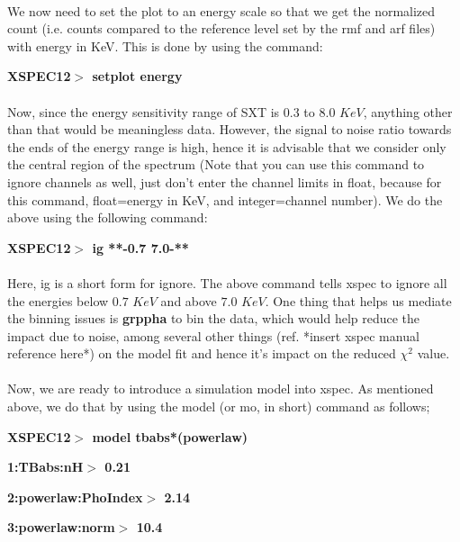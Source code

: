 \documentclass[a4paper,twoside]{report}
\numberwithin{equation}{section}
\begin{document}
\paragraph{}
We now need to set the plot to an energy scale so that we get the normalized count (i.e. counts compared to the reference level set by the rmf and arf files) with energy in KeV. This is done by using the command:
\begin{center}
\item \large \textbf{XSPEC12$>$ setplot energy}
\end{center}
\paragraph{}
Now, since the energy sensitivity range of SXT is $0.3$ to $8.0$ $KeV$, anything other than that would be meaningless data. However, the signal to noise ratio towards the ends of the energy range is high, hence it is advisable that we consider only the central region of the spectrum (Note that you can use this command to ignore channels as well, just don't enter the channel limits in float, because for this command, float=energy in KeV, and integer=channel number). We do the above using the following command:
\begin{center}
\item \large \textbf{XSPEC12$>$ ig **-0.7 7.0-**}
\end{center}
\paragraph{}
Here, ig is a short form for ignore. The above command tells xspec to ignore all the energies below $0.7$ $KeV$ and above $7.0$ $KeV$. One thing that helps us mediate the binning issues is \textbf{grppha} to bin the data, which would help reduce the impact due to noise, among several other things (ref. *insert xspec manual reference here*) on the model fit and hence it's impact on the reduced $\chi^2$ value.
\paragraph{}
Now, we are ready to introduce a simulation model into xspec. As mentioned above, we do that by using the model (or mo, in short) command as follows;
\begin{center}
\item \large \textbf{XSPEC12$>$ model tbabs*(powerlaw)}
\item \large \textbf{1:TBabs:nH$>$ 0.21}
\item \large \textbf{2:powerlaw:PhoIndex$>$ 2.14}
\item \large \textbf{3:powerlaw:norm$>$ 10.4}
\end{center}
\end{document}
